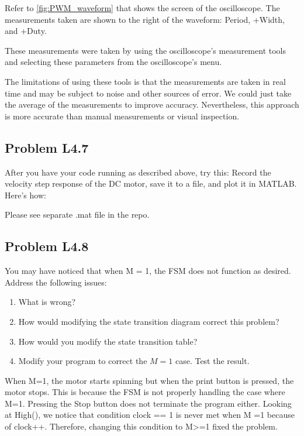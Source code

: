 \documentclass[10pt,twocolumn]{article}
\begin{document}
\vspace{\baselineskip}
Refer to \autoref{fig:PWM_waveform} that shows the screen of the oscilloscope. The measurements
taken are shown to the right of the waveform: Period, +Width, and +Duty.

These measurements were taken by using the oscilloscope's measurement tools and selecting
these parameters from the oscilloscope's menu.

The limitations of using these tools is that the measurements are taken in real time
and may be subject to noise and other sources of error. We could just take the average
of the measurements to improve accuracy. Nevertheless, this approach is more accurate than 
manual measurements or visual inspection.

\subsection{Problem L4.7}
After you have your code running as described above, try this:
Record the velocity step response of the DC motor, save it to a file, and plot it in
MATLAB. Here's how:

\vspace{\baselineskip}

Please see separate .mat file in the repo.

\subsection{Problem L4.8}
You may have noticed that when M = 1, the FSM does not
function as desired. Address the following issues:
\begin{enumerate}
	\item What is wrong?
	\item How would modifying the state transition diagram correct this problem?
	\item How would you modify the state transition table?
	\item Modify your program to correct the $M = 1$ case. Test the result.
\end{enumerate}

\vspace{\baselineskip}

When M=1, the motor starts spinning but when the print button is pressed, the motor stops. This is because the FSM is not properly handling the case where M=1.
Pressing the Stop button does not terminate the program either. Looking at High(), we notice that condition clock == 1 is never met when
M =1 because of clock++. Therefore, changing this condition to M>=1 fixed the problem.
\end{document}
